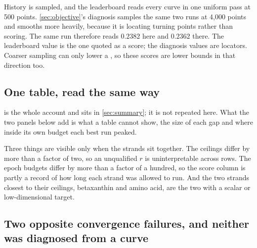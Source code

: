  History is sampled,
and the leaderboard reads every curve in one uniform pass at 500 points.
\cref{sec:objective}'s diagnosis samples the same two runs at 4,000 points and smooths more
heavily, because it is locating turning points rather than scoring. The same run therefore
reads $0.2382$ here and $0.2362$ there. The leaderboard value is the one quoted as a score;
the diagnosis values are locators. Coarser sampling can only lower a , so
these scores are lower bounds in that direction too.

\subsection{One table, read the same way}

 is the whole account and sits in \cref{sec:summary}; it is not
repeated here. What the two panels below add is what a table cannot show, the size of each
gap and where inside its own budget each best run peaked.



Three things are visible only when the strands sit together. The ceilings differ by more
than a factor of two, so an unqualified $r$ is uninterpretable across rows. The epoch
budgets differ by more than a factor of a hundred, so the score column is partly a record of
how long each strand was allowed to run. And the two strands closest to their ceilings,
betaxanthin and amino acid, are the two with a scalar or low-dimensional target.

\subsection{Two opposite convergence failures, and neither was diagnosed from a curve}

